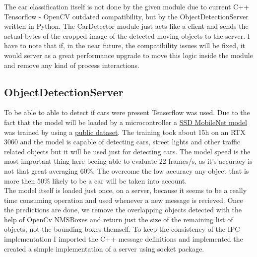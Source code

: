 \documentclass[17pt]{article}
\begin{document}
\indent \indent
The car classification itself is 
not done by the given module due to current C++ Tensorflow - OpenCV outdated compatibility,
but by the ObjectDetectionServer written in Python. The CarDetector module just acts 
like a client and sends the actual bytes of the cropped image of the detected moving objects 
to the server. I have to note that if, in the near future, the compatibility issues
will be fixed, it would server as a great performance upgrade to move this logic
inside the module and remove any kind of process interactions.


\subsection{ObjectDetectionServer} 
\indent \indent
To be able to able to detect if cars were present Tenserflow was used. Due to the fact 
that the model will be loaded by a microcontroller a
\href{https://github.com/tensorflow/models/blob/master/research/object_detection/g3doc/tf2_detection_zoo.md}{SSD MobileNet model}
was trained by using a \href{https://universe.roboflow.com/pedro-azevedo-3c9ol/bdd100k-3zgda/dataset/5}{public dataset}.
The training took about 15h on an RTX 3060 and the model is capable of detecting cars,
street lights and other traffic related objects but it will be used just for detecting cars.
The model speed is the most important thing here beeing able to evaluate 22 frames/s,
as it's accuracy is not that great averaging 60\%. The overcome the low accuracy any object 
that is more then 50\% likely to be a car will be taken into account.\\

\indent {}
The model itself is loaded just once, on a server, because it seems to be a really time consuming 
operation and used whenever a new message is recieved. Once the predictions are done, we 
remove the overlapping objects detected with the help of OpenCv NMSBoxes and return just the size 
of the remaining list of objects, not the bounding boxes themself. To keep the consistency of
the IPC implementation I imported the C++ message definitions and implemented the created a
simple implementation of a server using socket package.  



\pagebreak
\end{document}
